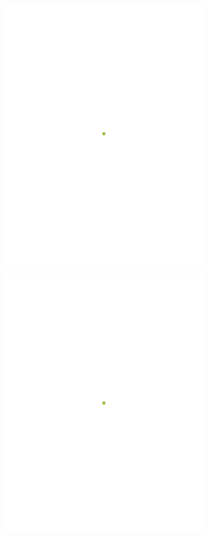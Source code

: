 \begin{figure}[H]
	\centering
	\includegraphics[width=0.8\textwidth]{media/pish2/image14}
	\caption*{}
\end{figure}

\begin{figure}[H]
	\centering
	\includegraphics[width=0.8\textwidth]{media/pish2/image16}
	\caption*{}
\end{figure}

